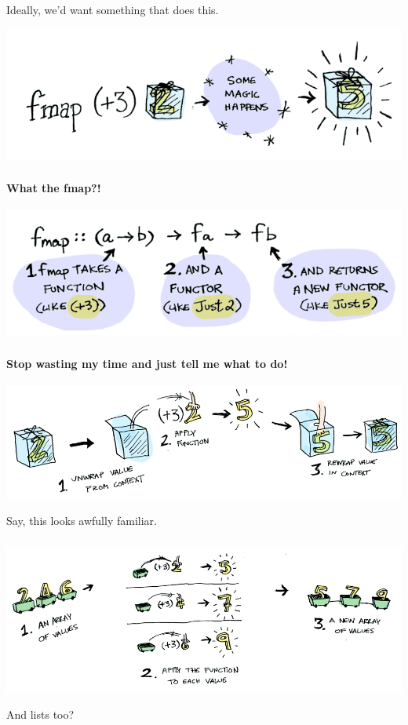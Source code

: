 \documentclass{beamer}
\begin{document}
\begin{frame}
    \frametitle{\insertsection}
    Ideally, we'd want something that does this.
    \centerline{\includegraphics[scale=0.4]{images/fmap_apply.png}}
\end{frame}

\begin{frame}
    \frametitle{\insertsection}
    \framesubtitle{What the fmap?!}
    \centerline{\includegraphics[scale=0.4]{images/fmap_def.png}}
\end{frame}

\begin{frame}
    \frametitle{\insertsection}
    \framesubtitle{Stop wasting my time and just tell me what to do!}
    \centerline{\includegraphics[scale=0.3]{images/fmap_just.png}}
    Say, this looks awfully familiar.
\end{frame}

\begin{frame}
    \frametitle{\insertsection}
    \centerline{\includegraphics[scale=0.3]{images/fmap_list.png}}
    And lists too?
\end{frame}
\end{document}
